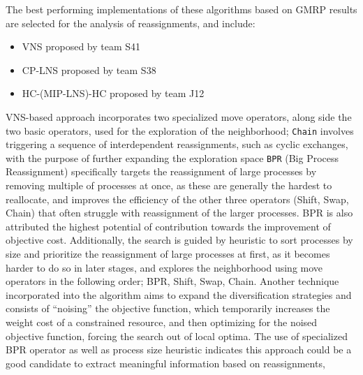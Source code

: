 \documentclass[a4paper,12pt]{Classes/RoboticsLaTeX}
\begin{document}
The best performing implementations of these algorithms based on GMRP results are selected for the analysis of reassignments, and include:

\begin{itemize} \setlength\itemsep{0em} \setlength\parskip{0pt} \setlength\parsep{0pt}
    \item VNS proposed by team S41 \cite{gavranovic2012}
    \item CP-LNS proposed by team S38 \cite{mehta2012}
    \item HC-(MIP-LNS)-HC proposed by team J12 \cite{jaskowski2016}
\end{itemize}

VNS-based approach incorporates two specialized move operators, along
side the two basic operators, used for the exploration of the
neighborhood; \texttt{Chain} involves triggering a sequence of
interdependent reassignments, such as cyclic exchanges, with the purpose
of further expanding the exploration space \texttt{BPR} (Big Process
Reassignment) specifically targets the reassignment of large processes
by removing multiple of processes at once, as these are generally the
hardest to reallocate, and improves the efficiency of the other three
operators (Shift, Swap, Chain) that often struggle with reassignment of
the larger processes. BPR is also attributed the highest potential of
contribution towards the improvement of objective cost. Additionally,
the search is guided by heuristic to sort processes by size and
prioritize the reassignment of large processes at first, as it becomes
harder to do so in later stages, and explores the neighborhood using
move operators in the following order; BPR, Shift, Swap, Chain. Another
technique incorporated into the algorithm aims to expand the
diversification strategies and consists of ``noising'' the objective
function, which temporarily increases the weight cost of a constrained
resource, and then optimizing for the noised objective function, forcing
the search out of local optima. The use of specialized BPR operator as
well as process size heuristic indicates this approach could be a good
candidate to extract meaningful information based on reassignments,
\end{document}
